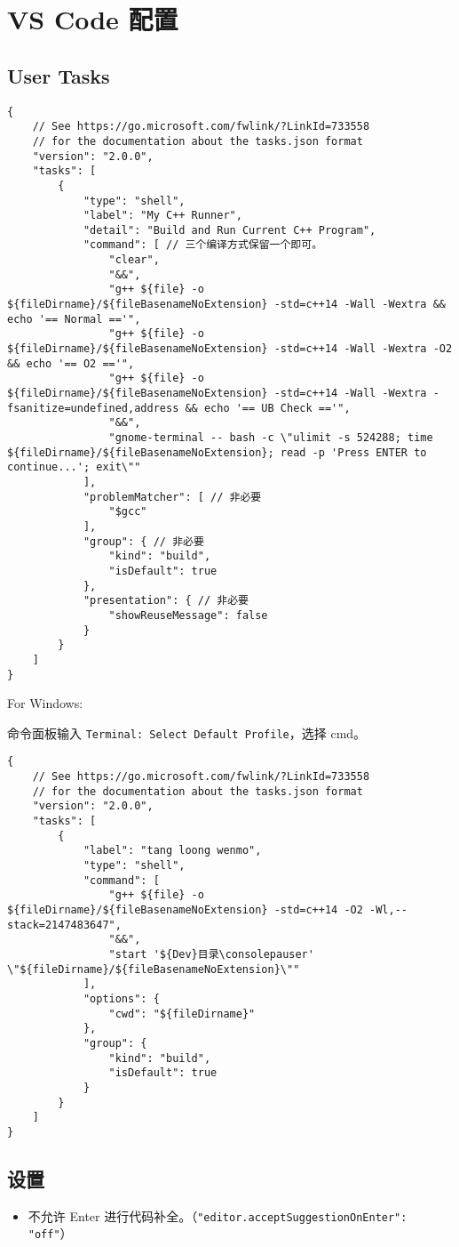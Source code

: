 \section{VS Code 配置}

\subsection{User Tasks}

\begin{verbatim}
{
    // See https://go.microsoft.com/fwlink/?LinkId=733558
    // for the documentation about the tasks.json format
    "version": "2.0.0",
    "tasks": [
        {
            "type": "shell",
            "label": "My C++ Runner",
            "detail": "Build and Run Current C++ Program",
            "command": [ // 三个编译方式保留一个即可。
                "clear",
                "&&",
                "g++ ${file} -o ${fileDirname}/${fileBasenameNoExtension} -std=c++14 -Wall -Wextra && echo '== Normal =='",
                "g++ ${file} -o ${fileDirname}/${fileBasenameNoExtension} -std=c++14 -Wall -Wextra -O2 && echo '== O2 =='",
                "g++ ${file} -o ${fileDirname}/${fileBasenameNoExtension} -std=c++14 -Wall -Wextra -fsanitize=undefined,address && echo '== UB Check =='",
                "&&",
                "gnome-terminal -- bash -c \"ulimit -s 524288; time ${fileDirname}/${fileBasenameNoExtension}; read -p 'Press ENTER to continue...'; exit\""
            ],
            "problemMatcher": [ // 非必要
                "$gcc"
            ],
            "group": { // 非必要
                "kind": "build",
                "isDefault": true
            },
            "presentation": { // 非必要
                "showReuseMessage": false
            }
        }
    ]
}
\end{verbatim}

For Windows:

命令面板输入 \lstinline|Terminal: Select Default Profile|，选择 cmd。

\begin{verbatim}
{
    // See https://go.microsoft.com/fwlink/?LinkId=733558
    // for the documentation about the tasks.json format
    "version": "2.0.0",
    "tasks": [
        {
            "label": "tang loong wenmo",
            "type": "shell",
            "command": [
                "g++ ${file} -o ${fileDirname}/${fileBasenameNoExtension} -std=c++14 -O2 -Wl,--stack=2147483647",
                "&&",
                "start '${Dev}目录\consolepauser' \"${fileDirname}/${fileBasenameNoExtension}\""
            ],
            "options": {
                "cwd": "${fileDirname}"
            },
            "group": {
                "kind": "build",
                "isDefault": true
            }
        }
    ]
}
\end{verbatim}

\subsection{设置}

\begin{itemize}
    \item 不允许 Enter 进行代码补全。（\lstinline|"editor.acceptSuggestionOnEnter": "off"|）
\end{itemize}